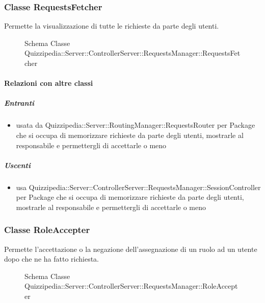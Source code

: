 \subsubsection{Classe RequestsFetcher}
Permette la visualizzazione di tutte le richieste da parte degli utenti.
\begin{figure}[H]
\centering
\noindent{}
\caption[Schema Classe RequestsFetcher]{Schema Classe Quizzipedia::Server::ControllerServer::RequestsManager::RequestsFetcher}
\end{figure}
\paragraph{Relazioni con altre classi}
\subparagraph{Entranti}
\begin{itemize}
\item usata da Quizzipedia::Server::RoutingManager::RequestsRouter per Package che si occupa di memorizzare richieste da parte degli utenti, mostrarle al responsabile e permettergli di accettarle o meno
\end{itemize}
\subparagraph{Uscenti}
\begin{itemize}
\item usa Quizzipedia::Server::ControllerServer::RequestsManager::SessionController per Package che si occupa di memorizzare richieste da parte degli utenti, mostrarle al responsabile e permettergli di accettarle o meno
\end{itemize}
\subsubsection{Classe RoleAccepter}
Permette l'accettazione o la negazione dell'assegnazione di un ruolo ad un utente dopo che ne ha fatto richiesta.
\begin{figure}[H]
\centering
\noindent{}
\caption[Schema Classe RoleAccepter]{Schema Classe Quizzipedia::Server::ControllerServer::RequestsManager::RoleAccepter}
\end{figure}

